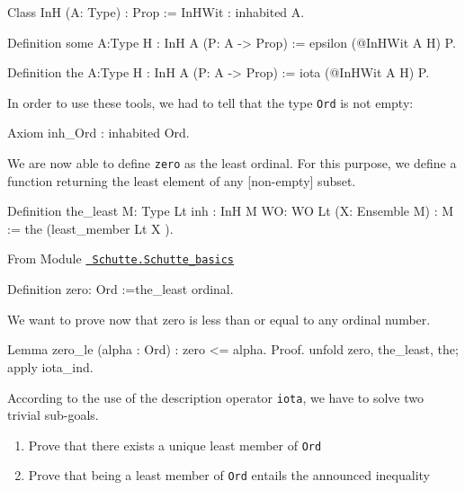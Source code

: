 \documentclass[a4paper]{book}
\begin{document}

\begin{Coqsrc}
Class InH (A: Type) : Prop :=
   InHWit : inhabited A.

Definition some {A:Type} {H : InH A} (P: A -> Prop) := 
   epsilon (@InHWit A H) P.

Definition the {A:Type} {H : InH A} (P: A -> Prop) := 
   iota (@InHWit A H) P.
\end{Coqsrc}

In order to use these tools,  we had to tell \coq{}  that the type \texttt{Ord} is not empty:

\begin{Coqsrc}
Axiom inh_Ord : inhabited Ord.
\end{Coqsrc}


We are now able to define \texttt{zero} as the least ordinal. For this purpose,
we define a function returning the least element of any [non-empty]  subset.


\begin{Coqsrc}
Definition the_least {M: Type} {Lt}
           {inh : InH M} {WO: WO Lt} (X: Ensemble M)  : M :=
  the  (least_member  Lt X ).
\end{Coqsrc}


\vspace{4pt}

From Module \href{../src/html/hydras.Schutte.Schutte_basics.html}%
{\texttt{~Schutte.Schutte\_basics}}

\label{Constants:zero:Ord}

\begin{Coqsrc}
Definition zero: Ord :=the_least ordinal.
\end{Coqsrc}

We want to prove now that zero is less than or equal to any ordinal number.

\begin{Coqsrc}
Lemma zero_le (alpha : Ord) :  zero <= alpha.
Proof.
  unfold zero, the_least, the; apply iota_ind.
\end{Coqsrc}

According to the use of the description operator \texttt{iota}, we have to solve  two trivial sub-goals.
\begin{enumerate}
\item Prove that there exists a unique least member of \texttt{Ord}
\item Prove that being a least member of \texttt{Ord} entails the announced inequality 
\end{enumerate}
\end{document}
